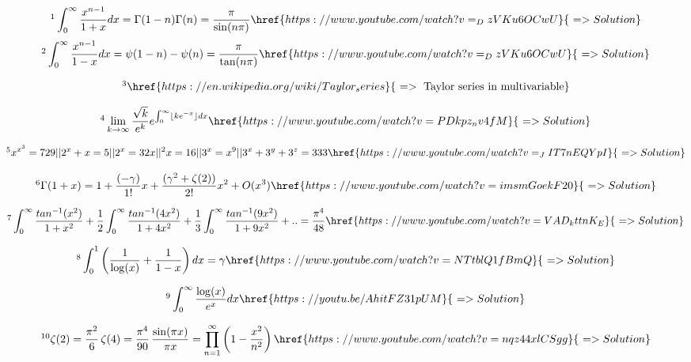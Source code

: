 \documentclass[12pt]{article}
\begin{document}
\[ \footnote{ A sad story of two brothers} \int_0^{\infty} \frac{x^{n-1}}{1+x}dx =\Gamma(1-n) \Gamma(n)= \frac{\pi}{\sin(n \pi)} \href{https://www.youtube.com/watch?v=_DzVKu6OCwU}{\,\, => Solution} \]
\[ \footnote{ A sad story of two brothers-II} \int_0^{\infty} \frac{x^{n-1}}{1-x}dx =\psi(1-n)-\psi(n) = \frac{\pi}{\tan(n \pi)}  \href{https://www.youtube.com/watch?v=_DzVKu6OCwU}{\,\, => Solution} \] 

\[ \footnote{ There's something important to look at} \href{https://en.wikipedia.org/wiki/Taylor_series}{\,\, => \text{ Taylor series in multivariable}} \]

\[ \footnote{ Can you see the factorial in the problem? If yes, this problem is for you } \lim_{k\to\infty} \frac{\sqrt{k}}{e^k} e^{\int_0^{\infty} \lfloor k e^{-x} \rfloor  dx }  \href{https://www.youtube.com/watch?v=PDkpz_nv4fM}{\,\, => Solution} \]

\[ \footnote{ Five fake olympiad problems on youtube and a nice problem} x^{x^3}=729 || 2^x + x = 5 || 2^x=32x || ^2x=16 || 3^x=x^9 || 3^x+3^y+3^z=333  \href{https://www.youtube.com/watch?v=_JIT7nEQYpI}{\,\, => Solution} \]
 
\[ \footnote{ Series Expansion for Gamma Function} \Gamma(1+x) = 1+ \frac{(-\gamma)}{1!}x + \frac{(\gamma^2 +\zeta(2))}{2!}x^2 + O(x^3)  \href{https://www.youtube.com/watch?v=imsmGoekF20}{\,\, => Solution} \]

\[ \footnote{ A nice Problem from Romanian Mathematical Magazine} \int_0^{\infty} \frac{tan^{-1}(x^2)}{1+x^2} + \frac{1}{2} \int_0^{\infty} \frac{tan^{-1}(4x^2)}{1+4x^2} + \frac{1}{3} \int_0^{\infty} \frac{tan^{-1}(9x^2)}{1+9x^2}+..= \frac{\pi^4}{48}    \href{https://www.youtube.com/watch?v=VAD_kttnK_E}{\,\, => Solution}  \]

\[ \footnote{ A beautiful integral for the Euler-Mascheroni Constant} \int_0^1 \left( \frac{1}{\log(x)} + \frac{1}{1-x} \right) dx  = \gamma \href{https://www.youtube.com/watch?v=NTtblQ1fBmQ}{\,\, => Solution} \]

\[ \footnote{ For the love of e } \int_0^{\infty} \frac{\log(x)}{e^x} dx \href{https://youtu.be/AhitFZ31pUM}{\,\, => Solution} \]

\[ \footnote{ How euler found zeta(2) and zeta(4) from Sine product formula?} \zeta(2)= \frac{\pi^2}{6}\,\zeta(4)= \frac{\pi^4}{90} \, \frac{\sin(\pi x)}{\pi x} = \prod_{n=1}^{\infty} \left( 1- \frac{x^2}{n^2} \right) \href{https://www.youtube.com/watch?v=nqz44xlCSgg}{\,\, => Solution} \]
\end{document}
